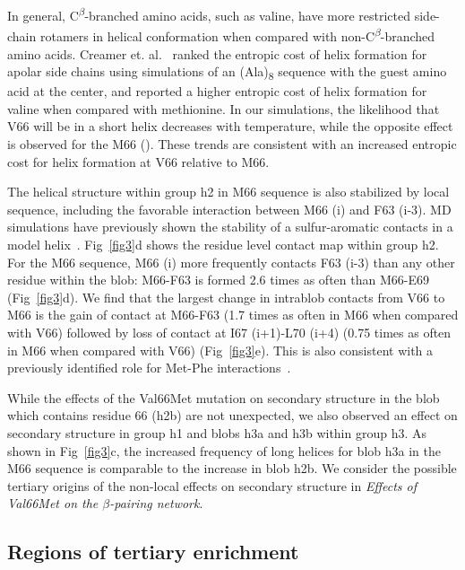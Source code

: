 \documentclass[10pt,letterpaper]{article}
\begin{document}
In general, C\textsuperscript{$\beta$}-branched amino acids, such as valine, have more restricted side-chain rotamers in helical conformation when compared with non-C\textsuperscript{$\beta$}-branched amino acids. Creamer et. al.~\cite{Creamer1992} ranked the entropic cost of helix formation for apolar side chains using simulations of an (Ala)\textsubscript{8} sequence with the guest amino acid at the center, and reported a higher entropic cost of helix formation for valine when compared with methionine. In our simulations, the likelihood that V66 will be in a short helix decreases with temperature, while the opposite effect is observed for the M66 (). These trends are consistent with an increased entropic cost for helix formation at V66 relative to M66. 

The helical structure within group h2 in M66 sequence is also stabilized by local sequence, including the favorable interaction between M66 (i) and F63 (i-3). MD simulations have previously shown the stability of a sulfur-aromatic contacts in a model helix~\cite{Viguera1995}. Fig~\ref{fig3}d shows the residue level contact map within group h2. For the M66 sequence, M66 (i) more frequently contacts F63 (i-3) than any other residue within the blob: M66-F63 is formed 2.6 times as often than M66-E69 (Fig~\ref{fig3}d). We find that the largest change in intrablob contacts from V66 to M66 is the gain of contact at M66-F63 (1.7 times as often in M66 when compared with V66) followed by loss of contact at I67 (i+1)-L70 (i+4) (0.75 times as often in M66 when compared with V66) (Fig~\ref{fig3}e). This is also consistent with a previously identified role for Met-Phe interactions~\cite{Viguera1995,Faure2008,Valley2012,Gomez-Tamayo2016}.
 
While the effects of the Val66Met mutation on secondary structure in the blob which contains residue 66 (h2b) are not unexpected, we also observed an effect on secondary structure in group h1 and blobs h3a and h3b within group h3. As shown in Fig~\ref{fig3}c, the increased frequency of long helices for blob h3a in the M66 sequence is comparable to the increase in blob h2b. We consider the possible tertiary origins of the non-local effects on secondary structure in \emph{{\it Effects of Val66Met on the $\beta$-pairing network}}.

\subsection*{Regions of tertiary enrichment}
\label{sec:interdomain}
\end{document}
